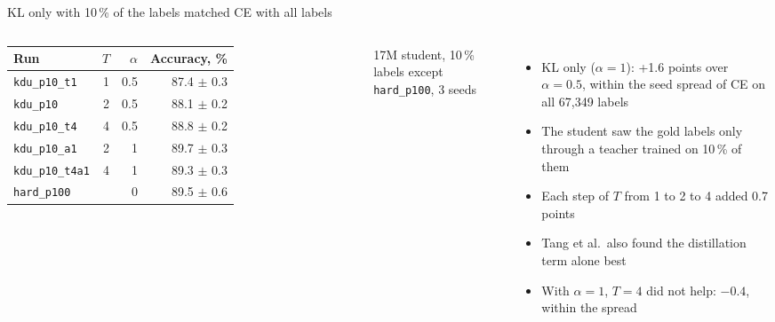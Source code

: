 \documentclass[aspectratio=169,11pt]{beamer}
\begin{document}
\begin{frame}{KL only with 10\,\% of the labels matched CE with all labels}
  \begin{columns}[T]
    \small
    \begin{tabular}{lrrr}
      \toprule
      Run & $T$ & $\alpha$ & Accuracy, \% \\
      \midrule
      \texttt{kdu\_p10\_t1} & 1 & 0.5 & 87.4 $\pm$ 0.3 \\
      \texttt{kdu\_p10} & 2 & 0.5 & 88.1 $\pm$ 0.2 \\
      \texttt{kdu\_p10\_t4} & 4 & 0.5 & 88.8 $\pm$ 0.2 \\
      \texttt{kdu\_p10\_a1} & 2 & 1 & 89.7 $\pm$ 0.3 \\
      \texttt{kdu\_p10\_t4a1} & 4 & 1 & 89.3 $\pm$ 0.3 \\
      \texttt{hard\_p100} & & 0 & 89.5 $\pm$ 0.6 \\
      \bottomrule
    \end{tabular}

    \footnotesize 17M student, 10\,\% labels except \texttt{hard\_p100}, 3 seeds
    \begin{itemize}
      \item KL only ($\alpha = 1$): +1.6 points over $\alpha = 0.5$, within the seed spread of CE on all 67,349 labels
      \item The student saw the gold labels only through a teacher trained on 10\,\% of them
      \item Each step of $T$ from 1 to 2 to 4 added 0.7 points
      \item Tang et al.\ also found the distillation term alone best
      \item With $\alpha = 1$, $T = 4$ did not help: $-0.4$, within the spread
    \end{itemize}
  \end{columns}
\end{frame}
\end{document}
